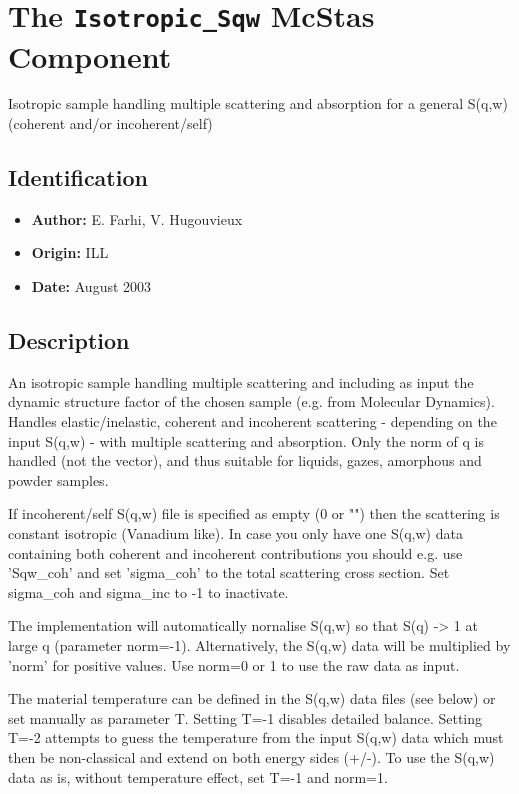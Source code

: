 \section{The \texttt{Isotropic\_Sqw} McStas Component}
Isotropic sample handling multiple scattering and absorption for a general
S(q,w) (coherent and/or incoherent/self)

\subsection*{Identification}
\begin{itemize}
  \item \textbf{Author:} E. Farhi, V. Hugouvieux
  \item \textbf{Origin:} ILL
  \item \textbf{Date:} August 2003
\end{itemize}

\subsection*{Description}
An isotropic sample handling multiple scattering and including as input the dynamic structure factor of the chosen sample (e.g. from Molecular Dynamics). Handles elastic/inelastic, coherent and incoherent scattering - depending on the input S(q,w) - with multiple scattering and absorption. Only the norm of q is handled (not the vector), and thus suitable for liquids, gazes, amorphous and powder samples.

If incoherent/self S(q,w) file is specified as empty (0 or "") then the scattering is constant isotropic (Vanadium like). In case you only have one S(q,w) data containing both coherent and incoherent contributions you should e.g. use 'Sqw\_coh' and set 'sigma\_coh' to the total scattering cross section. Set sigma\_coh and sigma\_inc to -1 to inactivate.

The implementation will automatically nornalise S(q,w) so that S(q) -\textgreater{} 1 at large q (parameter norm=-1). Alternatively, the S(q,w) data will be multiplied by 'norm' for positive values. Use norm=0 or 1 to use the raw data as input.

The material temperature can be defined in the S(q,w) data files (see below) or set manually as parameter T. Setting T=-1 disables detailed balance. Setting T=-2 attempts to guess the temperature from the input S(q,w) data which must then be non-classical and extend on both energy sides (+/-). To use the S(q,w) data as is, without temperature effect, set T=-1 and norm=1.

